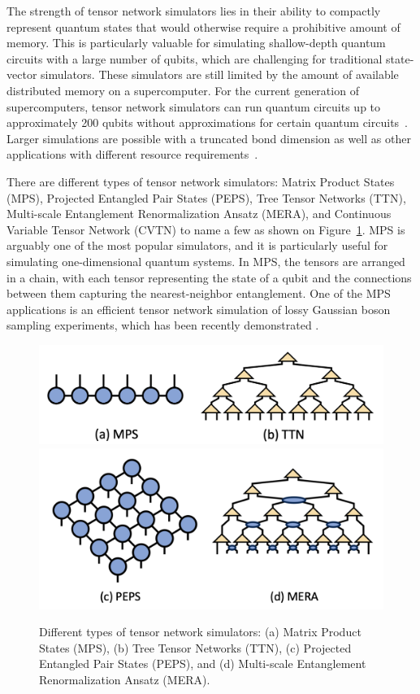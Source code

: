 The strength of tensor network simulators lies in their ability to compactly represent quantum states that would otherwise require a prohibitive amount of memory. This is particularly valuable for simulating shallow-depth quantum circuits with a large number of qubits, which are challenging for traditional state-vector simulators. These simulators are still limited by the amount of available distributed memory on a supercomputer. For the current generation of supercomputers, tensor network simulators can run quantum circuits up to approximately 200 qubits without approximations for certain quantum circuits~\cite{lykov2021large}. Larger simulations are possible with a truncated bond dimension as well as other applications with different resource requirements~\cite{preopt-1}.


There are different types of tensor network simulators: Matrix Product States (MPS), Projected Entangled Pair States (PEPS), Tree Tensor Networks (TTN), Multi-scale Entanglement Renormalization Ansatz (MERA), and Continuous Variable Tensor Network (CVTN) to name a few as shown on Figure~\ref{fig:tensornetworks}. MPS is arguably one of the most popular simulators, and it is particularly useful for simulating one-dimensional quantum systems. In MPS, the tensors are arranged in a chain, with each tensor representing the state of a qubit and the connections between them capturing the nearest-neighbor entanglement. One of the MPS applications is an efficient tensor network simulation of lossy Gaussian boson sampling experiments, which has been recently demonstrated \cite{liu2023simulating, Oh2023}.

\begin{figure}
\includegraphics[width=\columnwidth]{groups/3._Classical_simulation_of_quantum_systems/MPS-TTN.png}
\includegraphics[width=\columnwidth]{groups/3._Classical_simulation_of_quantum_systems/PEPS-MERA.png}
\caption{Different types of tensor network simulators: (a) Matrix Product States (MPS), (b) Tree Tensor Networks (TTN), (c) Projected Entangled Pair States (PEPS), and (d) Multi-scale Entanglement Renormalization Ansatz (MERA).}
\label{fig:tensornetworks}
\end{figure}

